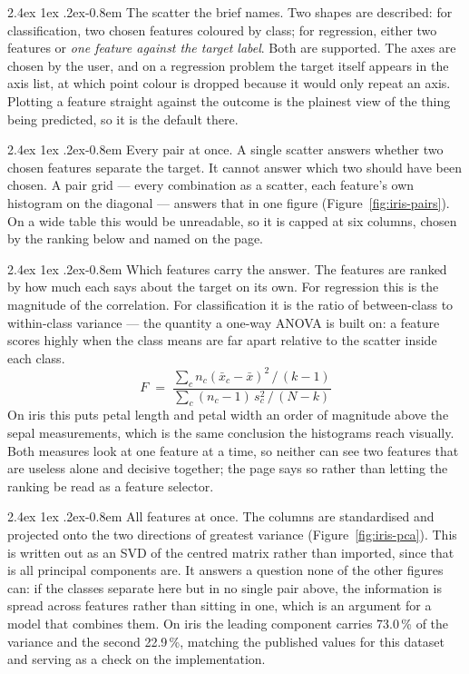 \documentclass[11pt,a4paper]{article}
\makeatletter
\renewcommand\paragraph{\@startsection{paragraph}{4}{\z@}%
  {2.4ex \@plus1ex \@minus.2ex}{-0.8em}%
  {\normalfont\normalsize\sffamily\bfseries\color{code}}}
\makeatother
\begin{document}
\paragraph{The scatter the brief names.} Two shapes are described: for
classification, two chosen features coloured by class; for regression, either two
features or \emph{one feature against the target label}. Both are supported. The
axes are chosen by the user, and on a regression problem the target itself
appears in the axis list, at which point colour is dropped because it would only
repeat an axis. Plotting a feature straight against the outcome is the plainest
view of the thing being predicted, so it is the default there.

\paragraph{Every pair at once.} A single scatter answers whether two chosen
features separate the target. It cannot answer which two should have been chosen.
A pair grid --- every combination as a scatter, each feature's own histogram on
the diagonal --- answers that in one figure (Figure~\ref{fig:iris-pairs}). On a
wide table this would be unreadable, so it is capped at six columns, chosen by
the ranking below and named on the page.

\paragraph{Which features carry the answer.} The features are ranked by how much
each says about the target on its own. For regression this is the magnitude of
the correlation. For classification it is the ratio of between-class to
within-class variance --- the quantity a one-way ANOVA is built on: a feature
scores highly when the class means are far apart relative to the scatter inside
each class.
\[
  F \;=\; \frac{\sum_c n_c (\bar{x}_c - \bar{x})^2 \,/\, (k-1)}
                {\sum_c (n_c - 1)\, s_c^2 \,/\, (N-k)}
\]
On iris this puts petal length and petal width an order of magnitude above the
sepal measurements, which is the same conclusion the histograms reach visually.
Both measures look at one feature at a time, so neither can see two features that
are useless alone and decisive together; the page says so rather than letting the
ranking be read as a feature selector.

\paragraph{All features at once.} The columns are standardised and projected onto
the two directions of greatest variance (Figure~\ref{fig:iris-pca}). This is
written out as an SVD of the centred matrix rather than imported, since that is
all principal components are. It answers a question none of the other figures
can: if the classes separate here but in no single pair above, the information is
spread across features rather than sitting in one, which is an argument for a
model that combines them. On iris the leading component carries 73.0\,\% of the
variance and the second 22.9\,\%, matching the published values for this dataset
and serving as a check on the implementation.
\end{document}
